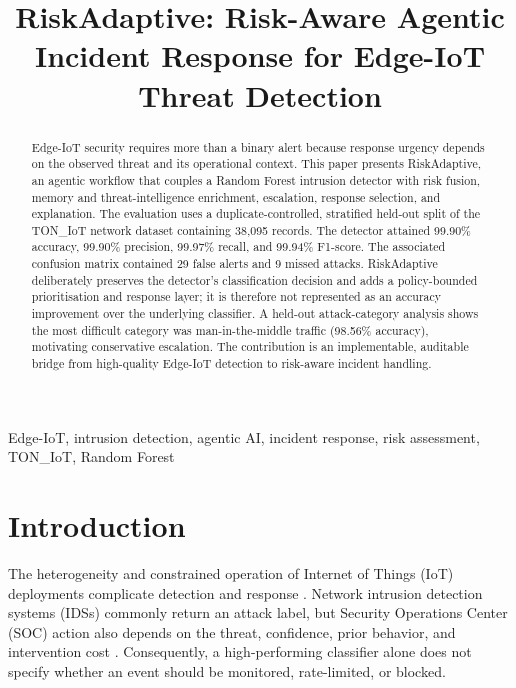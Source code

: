 \documentclass[conference]{IEEEtran}
\begin{document}
\title{RiskAdaptive: Risk-Aware Agentic Incident Response for Edge-IoT Threat Detection}

\author{
}
\maketitle

\begin{abstract}
Edge-IoT security requires more than a binary alert because response urgency depends on the observed threat and its operational context. This paper presents RiskAdaptive, an agentic workflow that couples a Random Forest intrusion detector with risk fusion, memory and threat-intelligence enrichment, escalation, response selection, and explanation. The evaluation uses a duplicate-controlled, stratified held-out split of the TON\_IoT network dataset containing 38,095 records. The detector attained 99.90\% accuracy, 99.90\% precision, 99.97\% recall, and 99.94\% F1-score. The associated confusion matrix contained 29 false alerts and 9 missed attacks. RiskAdaptive deliberately preserves the detector's classification decision and adds a policy-bounded prioritisation and response layer; it is therefore not represented as an accuracy improvement over the underlying classifier. A held-out attack-category analysis shows the most difficult category was man-in-the-middle traffic (98.56\% accuracy), motivating conservative escalation. The contribution is an implementable, auditable bridge from high-quality Edge-IoT detection to risk-aware incident handling.
\end{abstract}

\begin{IEEEkeywords}
Edge-IoT, intrusion detection, agentic AI, incident response, risk assessment, TON\_IoT, Random Forest
\end{IEEEkeywords}

\section{Introduction}
The heterogeneity and constrained operation of Internet of Things (IoT) deployments complicate detection and response \cite{algaradi2020,khraisat2019,diro2018}. Network intrusion detection systems (IDSs) commonly return an attack label, but Security Operations Center (SOC) action also depends on the threat, confidence, prior behavior, and intervention cost \cite{ahmed2016,nist61}. Consequently, a high-performing classifier alone does not specify whether an event should be monitored, rate-limited, or blocked.
\end{document}

